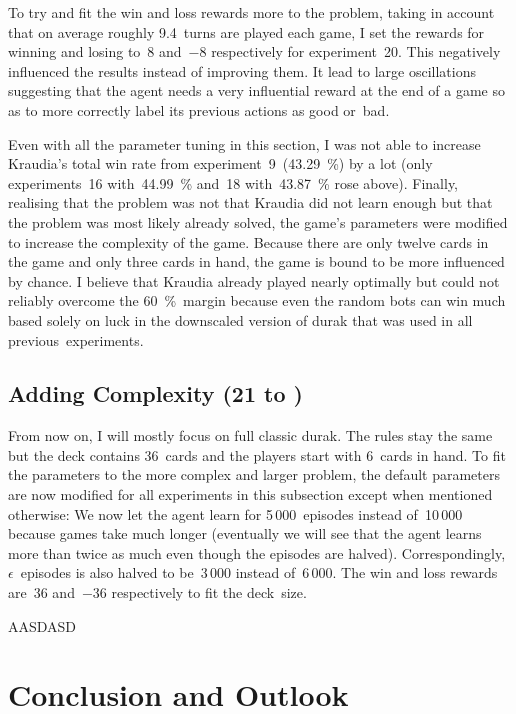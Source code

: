 \documentclass[a4paper,titlepage]{article}
\begin{document}
To try and fit the win and loss rewards more to the problem, taking in account that on average roughly 9.4~turns are played each game, I set the rewards for winning and losing to~8 and~$-8$ respectively for experiment~20. This negatively influenced the results instead of improving them. It lead to large oscillations suggesting that the agent needs a very influential reward at the end of a game so as to more correctly label its previous actions as good or~bad. \medskip

Even with all the parameter tuning in this section, I was not able to increase Kraudia's total win rate from experiment~9~(43.29~\%) by a lot (only experiments~16 with~44.99~\% and~18 with~43.87~\% rose above). Finally, realising that the problem was not that Kraudia did not learn enough but that the problem was most likely already solved, the game's parameters were modified to increase the complexity of the game. Because there are only twelve cards in the game and only three cards in hand, the game is bound to be more influenced by chance. I believe that Kraudia already played nearly optimally but could not reliably overcome the 60~\%~margin because even the random bots can win much based solely on luck in the downscaled version of durak that was used in all previous~experiments.

\subsection{Adding Complexity (21 to )} %

From now on, I will mostly focus on full classic durak. The rules stay the same but the deck contains 36~cards and the players start with 6~cards in hand. To fit the parameters to the more complex and larger problem, the default parameters are now modified for all experiments in this subsection except when mentioned otherwise: We now let the agent learn for 5\,000~episodes instead of~10\,000 because games take much longer (eventually we will see that the agent learns more than twice as much even though the episodes are halved). Correspondingly, $\epsilon$~episodes is also halved to be~3\,000 instead of~6\,000. The win and loss rewards are~36 and~$-36$ respectively to fit the deck~size.

AASDASD

\newpage

\section{Conclusion and Outlook}
\end{document}
